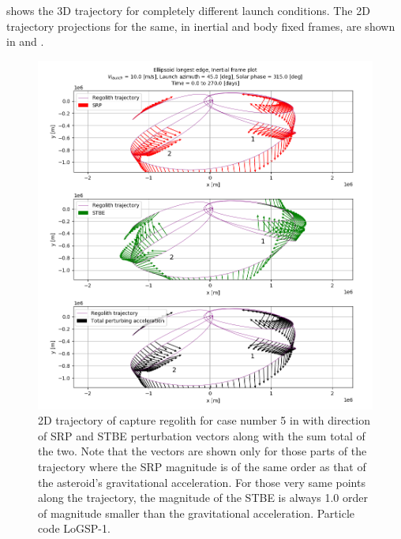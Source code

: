  shows the 3D trajectory for completely different launch conditions. The 2D trajectory projections for the same, in inertial and body fixed frames, are shown in  and .
\begin{figure}[htb]
\centering
\captionsetup{justification=centering}
\includegraphics[width=\textwidth, height=\textheight]{longest_edge_perturbations/3.2Density_1cmSize/TotalPerturbingVector_xyPlane_completeTraj_10ms_45DegAzim_315SolarPhase_edit.png}
\caption{2D trajectory of capture regolith for case number 5 in  with direction of \gls{SRP} and \gls{STBE} perturbation vectors along with the sum total of the two. Note that the vectors are shown only for those parts of the trajectory where the \gls{SRP} magnitude is of the same order as that of the asteroid's gravitational acceleration. For those very same points along the trajectory, the magnitude of the \gls{STBE} is always 1.0 order of magnitude smaller than the gravitational acceleration. Particle code LoGSP-1.}
\label{fig:LoGSP_1_capture_case_5_2d_trajectory_perturbationVectors}
\end{figure}
